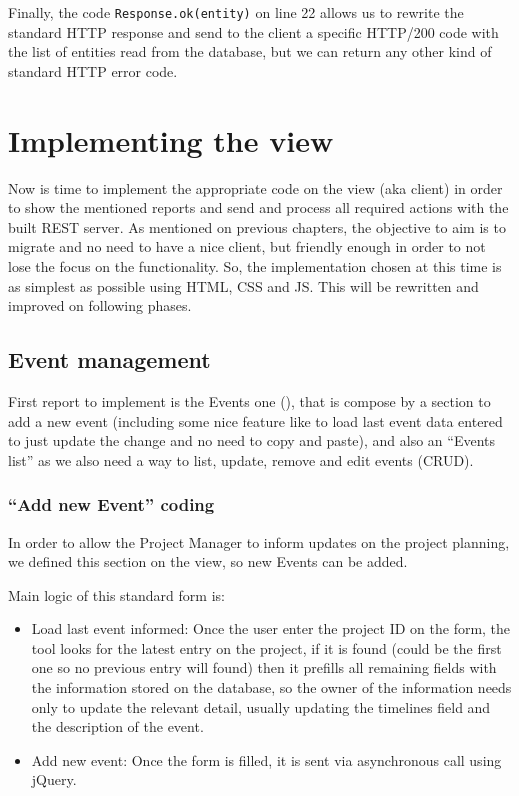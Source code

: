 Finally, the code \texttt{Response.ok(entity)} on line 22 allows us to rewrite
the standard HTTP response and send to the client a specific HTTP/200 code with the
list of entities read from the database, but we can return any other kind of
standard HTTP error code.

\section{Implementing the view}
Now is time to implement the appropriate code on the view (aka client) in order
to show the mentioned reports and send and process all required actions with
the built REST server. As mentioned on previous chapters, the objective to aim
is to migrate and no need to have a nice client, but friendly enough in order to
not lose the focus on the functionality. So, the implementation chosen at this
time is as simplest as possible using HTML, CSS and JS. This will be rewritten
and improved on following phases.

\subsection{Event management}
First report to implement is the Events one (), that
is compose by a section to add a new event (including some nice feature like to
load last event data entered to just update the change and no need to copy and
paste), and also an ``Events list'' as we also need a way to list, update,
remove and edit events (CRUD).

\subsubsection{``Add new Event'' coding}
In order to allow the Project Manager to inform updates on the project planning,
we defined this section on the view, so new Events can be added.

Main logic of this standard form is:
\begin{itemize}
  \item Load last event informed: Once the user enter the project ID on the
  form, the tool looks for the latest entry on the project, if it is found
  (could be the first one so no previous entry will found) then it prefills all
  remaining fields with the information stored on the database, so the owner of
  the information needs only to update  the relevant detail, usually updating
  the timelines field and the description of the event.
  \item Add new event: Once the form is filled, it is sent via asynchronous call
  using jQuery.
\end{itemize}

